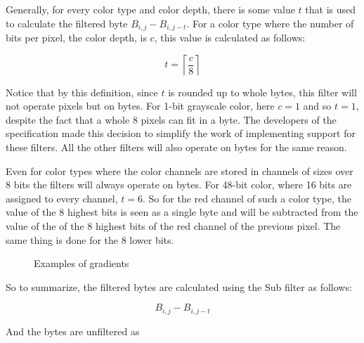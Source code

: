 Generally, for every color type and color depth, there is some value
$t$ that is used to calculate the filtered byte $B_{i,j} -
B_{i,j-t}$. For a color type where the number of bits per pixel, the
color depth, is $c$, this value is calculated as follows:

\begin{equation*}
  t = \left\lceil \frac{c}{8} \right\rceil
\end{equation*}

Notice that by this definition, since $t$ is rounded up to whole
bytes, this filter will not operate pixels but on bytes. For 1-bit
grayscale color, here $c=1$ and so $t=1$, despite the fact that a
whole $8$ pixels can fit in a byte. The developers of the \png
specification made this decision to simplify the work of implementing
support for these filters. All the other filters will also operate on
bytes for the same reason.

Even for color types where the color channels are stored in channels
of sizes over $8$ bits the filters will always operate on bytes. For
48-bit \rgb color, where 16 bits are assigned to every channel,
$t=6$. So for the red channel of such a color type, the value of the 8
highest bits is seen as a single byte and will be subtracted from the
value of the of the 8 highest bits of the red channel of the previous
pixel. The same thing is done for the 8 lower bits.

\begin{figure}[h!]
  \centering


  \caption{Examples of gradients}
\end{figure}

So to summarize, the filtered bytes are calculated using the Sub
filter as follows:

\begin{equation*}
  B_{i,j} - B_{i,j-t}
\end{equation*}

And the bytes are unfiltered as


